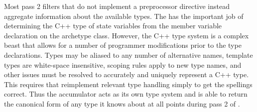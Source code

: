 Most pass 2 filters that do not implement a preprocessor directive instead
aggregate information about the available types. The  has
the important job of determining the C++ type of state variables from the 
member variable declaration on the archetype class. However, the C++ type system 
is a complex beast that allows for a number of programmer modifications prior 
to the type declarations.  Types may be aliased to any number of alternative 
names, template types are white-space insensitive, scoping rules apply 
to new type names, and other issues must be resolved to accurately and uniquely 
represent a C++ type.  This requires that \cycpp reimplement relevant type handling
simply to get the spellings correct. 
Thus the  accumulator acts as its own type system and is 
able to return the canonical form of any type it knows about at all points during 
pass 2 of \cycpp.

